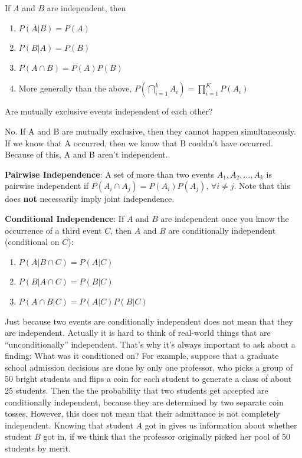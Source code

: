 \documentclass[]{book}
\providecommand{\tightlist}{%
  \setlength{\itemsep}{0pt}\setlength{\parskip}{0pt}}
\theoremstyle{definition}
\theoremstyle{definition}
\theoremstyle{definition}
\theoremstyle{remark}
\begin{document}
If \(A\) and \(B\) are independent, then

\begin{enumerate}
\def\labelenumi{\arabic{enumi}.}
\tightlist
\item
  \(P(A|B)=P(A)\)
\item
  \(P(B|A)=P(B)\)
\item
  \(P(A\cap B)=P(A)P(B)\)
\item
  More generally than the above,
  \(P(\bigcap_{i=1}^k A_i) = \prod_{i = 1}^K P(A_i)\)
\end{enumerate}

Are mutually exclusive events independent of each other?

No. If A and B are mutually exclusive, then they cannot happen
simultaneously. If we know that A occurred, then we know that B couldn't
have occurred. Because of this, A and B aren't independent.

\textbf{Pairwise Independence}: A set of more than two events
\(A_1, A_2, \dots, A_k\) is pairwise independent if
\(P(A_i\cap A_j)=P(A_i)P(A_j)\), \(\forall i\neq j\). Note that this
does \textbf{not} necessarily imply joint independence.

\textbf{Conditional Independence}: If \(A\) and \(B\) are independent
once you know the occurrence of a third event \(C\), then \(A\) and
\(B\) are conditionally independent (conditional on \(C\)):

\begin{enumerate}
\def\labelenumi{\arabic{enumi}.}
\tightlist
\item
  \(P(A|B \cap C)=P(A|C)\)
\item
  \(P(B|A \cap C)=P(B|C)\)
\item
  \(P(A\cap B|C)=P(A|C)P(B|C)\)
\end{enumerate}

Just because two events are conditionally independent does not mean that
they are independent. Actually it is hard to think of real-world things
that are ``unconditionally'' independent. That's why it's always
important to ask about a finding: What was it conditioned on? For
example, suppose that a graduate school admission decisions are done by
only one professor, who picks a group of 50 bright students and flips a
coin for each student to generate a class of about 25 students. Then the
the probability that two students get accepted are conditionally
independent, because they are determined by two separate coin tosses.
However, this does not mean that their admittance is not completely
independent. Knowing that student \(A\) got in gives us information
about whether student \(B\) got in, if we think that the professor
originally picked her pool of 50 students by merit.
\end{document}

